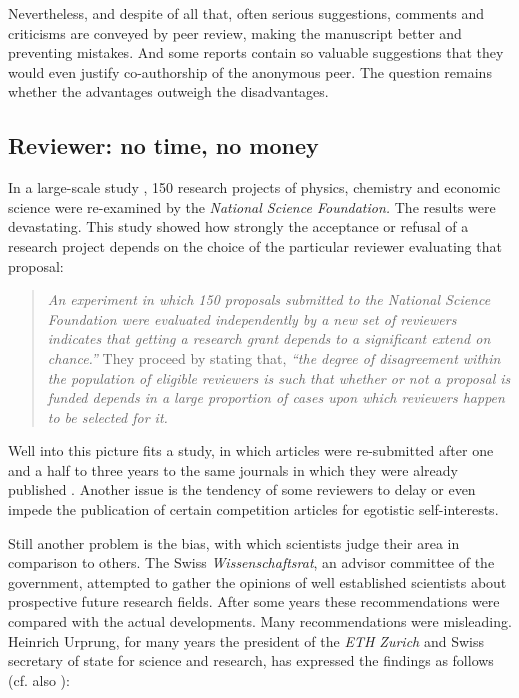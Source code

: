 Nevertheless, and despite of all that, often serious suggestions,
comments and criticisms are conveyed by peer review, making the
manuscript better and preventing mistakes.  And some reports contain
so valuable suggestions that they would even justify co-authorship of
the anonymous peer.  The question remains whether the advantages
outweigh the disadvantages.

\subsection{Reviewer:  no time, no money}

In a large-scale study \cite{1981-cole}, 150 research projects of
physics, chemistry and economic science were re-examined by the {\it
National Science Foundation.} The results were devastating.
This study showed how strongly the acceptance or refusal of
a research project depends on the choice of the particular reviewer
evaluating that proposal:  \begin{quote} {\em An experiment in which 150
proposals submitted to the National Science Foundation were evaluated
independently by a new set of reviewers indicates that getting a
research grant depends to a significant extend on chance.''} They
proceed by stating that, {\em ``the degree of disagreement within the
population of eligible reviewers is such that whether or not a proposal
is funded depends in a large proportion of cases upon which reviewers
happen to be selected for it.} \end{quote}

Well into this picture fits a study, in which articles were re-submitted
after one and a half to three years to the same journals in which they were
already published \cite{1982-petersceci}.  Another issue is the tendency
of some reviewers to delay or even impede the publication of certain
competition articles for egotistic self-interests.

Still another problem is the bias, with which scientists judge their area in
comparison to others.  The Swiss {\it Wissenschaftsrat}, an advisor
committee of the government, attempted to gather the opinions of well
established scientists about prospective future research fields.  After
some years these recommendations were compared with the actual
developments.  Many recommendations were misleading.  Heinrich Urprung,
for many years the president of the {\it ETH Zurich} and Swiss secretary
of state for science and research, has expressed the findings as follows
\cite{ursprung-1990} (cf. also \cite{swizz-science}):

